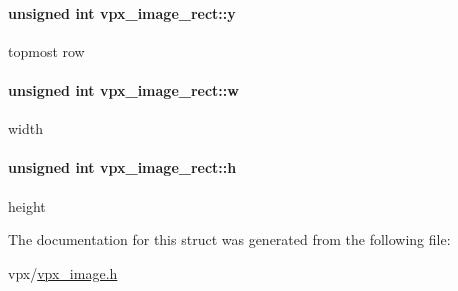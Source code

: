 \paragraph[{\texorpdfstring{y}{y}}]{\setlength{\rightskip}{0pt plus 5cm}unsigned int vpx\+\_\+image\+\_\+rect\+::y}\hypertarget{structvpx__image__rect_a6d4457644e2ce0d54af55eb313a37204}{}\label{structvpx__image__rect_a6d4457644e2ce0d54af55eb313a37204}
topmost row 
\paragraph[{\texorpdfstring{w}{w}}]{\setlength{\rightskip}{0pt plus 5cm}unsigned int vpx\+\_\+image\+\_\+rect\+::w}\hypertarget{structvpx__image__rect_a4b4fcec1e4cdcbd9dde5d44b6ad16dab}{}\label{structvpx__image__rect_a4b4fcec1e4cdcbd9dde5d44b6ad16dab}
width 
\paragraph[{\texorpdfstring{h}{h}}]{\setlength{\rightskip}{0pt plus 5cm}unsigned int vpx\+\_\+image\+\_\+rect\+::h}\hypertarget{structvpx__image__rect_afeb74a8c6f0c7e24d82b80db9431a501}{}\label{structvpx__image__rect_afeb74a8c6f0c7e24d82b80db9431a501}
height 

The documentation for this struct was generated from the following file\+:\begin{DoxyCompactItemize}
\item 
vpx/\hyperlink{vpx__image_8h}{vpx\+\_\+image.\+h}\end{DoxyCompactItemize}
